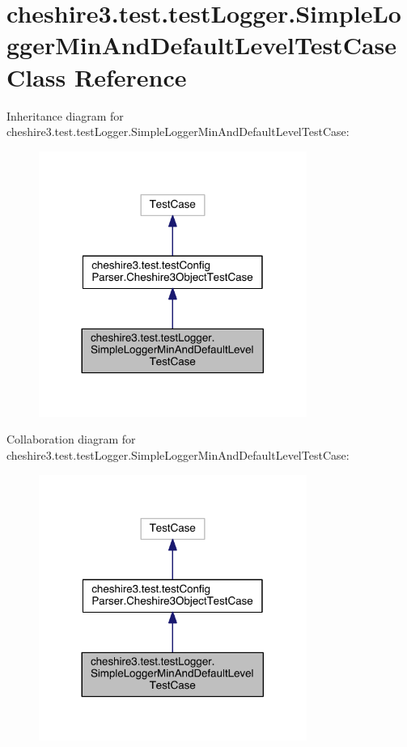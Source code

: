 \hypertarget{classcheshire3_1_1test_1_1test_logger_1_1_simple_logger_min_and_default_level_test_case}{\section{cheshire3.\-test.\-test\-Logger.\-Simple\-Logger\-Min\-And\-Default\-Level\-Test\-Case Class Reference}
\label{classcheshire3_1_1test_1_1test_logger_1_1_simple_logger_min_and_default_level_test_case}
}


Inheritance diagram for cheshire3.\-test.\-test\-Logger.\-Simple\-Logger\-Min\-And\-Default\-Level\-Test\-Case\-:
\nopagebreak
\begin{figure}[H]
\begin{center}
\leavevmode
\includegraphics[width=248pt]{classcheshire3_1_1test_1_1test_logger_1_1_simple_logger_min_and_default_level_test_case__inherit__graph}
\end{center}
\end{figure}


Collaboration diagram for cheshire3.\-test.\-test\-Logger.\-Simple\-Logger\-Min\-And\-Default\-Level\-Test\-Case\-:
\nopagebreak
\begin{figure}[H]
\begin{center}
\leavevmode
\includegraphics[width=248pt]{classcheshire3_1_1test_1_1test_logger_1_1_simple_logger_min_and_default_level_test_case__coll__graph}
\end{center}
\end{figure}
